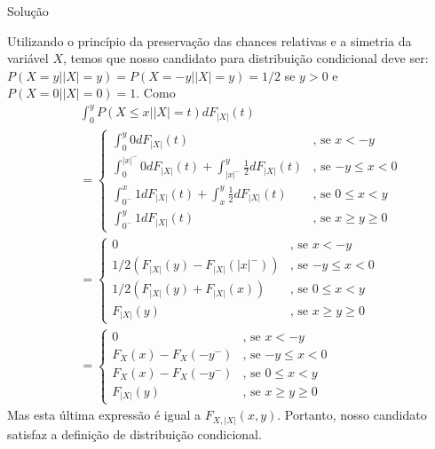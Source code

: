 \begin{frame}
\begin{block}{Solução}

Utilizando o princípio da preservação das chances relativas e a simetria da variável $X$, temos que nosso candidato para distribuição condicional deve ser:
$P(X=y||X|=y)=P(X=-y||X|=y)=1/2$ se $y>0$ e $P(X=0||X|=0)=1$. Como
\begin{eqnarray}
& & \int_{0}^{y}P(X\leq x||X|=t)dF_{|X|}(t)
\nonumber\\
& & =\left \{
\begin{array}{cc}
\int_{0}^{y} 0 dF_{|X|}(t) & \mbox{, se $x<-y$} \\
\int_{0}^{|x|^-} 0 dF_{|X|}(t)+\int_{|x|^-}^{y} \frac{1}{2} dF_{|X|}(t) & \mbox{, se $-y\leq x<0$}\\
\int_{0^-}^{x} 1 dF_{|X|}(t)+\int_{x}^{y} \frac{1}{2} dF_{|X|}(t)  &  \mbox{, se $0\leq x<y$}\\
\int_{0^-}^{y} 1 dF_{|X|}(t) & \mbox{, se $x\geq y\geq 0$}
\end{array}
\right.
\nonumber\\
& & =\left \{
\begin{array}{cc}
0 & \mbox{, se $x<-y$} \\
1/2(F_{|X|}(y)-F_{|X|}(|x|^-)) & \mbox{, se $-y\leq x<0$} \\
1/2(F_{|X|}(y)+F_{|X|}(x))  &  \mbox{, se $0\leq x<y$}\\
F_{|X|}(y) & \mbox{, se $x\geq y\geq 0$}
\end{array}
\right.
\nonumber\\
& & =\left \{
\begin{array}{cc}
0 & \mbox{, se $x<-y$} \\
F_X(x)-F_X(-y^-) & \mbox{, se $-y\leq x<0$}\\
F_X(x)-F_X(-y^-)  &  \mbox{, se $0\leq x<y$}\\
F_{|X|}(y) & \mbox{, se $x\geq y\geq 0$}
\end{array}
\right.\nonumber
\end{eqnarray}
Mas esta última expressão é igual a $F_{X,|X|}(x,y)$. Portanto, nosso candidato satisfaz a definição de distribuição condicional.

\end{block}
\end{frame}


